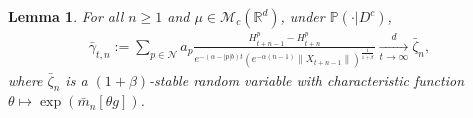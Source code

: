 \documentclass[12pt,a4paper]{amsart}
\theoremstyle{plain}
\newtheorem{lem}[thm]{Lemma}
\theoremstyle{definition}
\numberwithin{equation}{section}
\begin{document}
\begin{lem}
  \label{large-central}
  For all $n\ge 1$ and $\mu\in\mathcal{M}_c(\mathbb{R}^d)$, under $\mathbb{P}(\cdot|D^c)$,
\begin{align}
  \bar{\gamma}_{t,n}
  := \sum_{p\in\mathcal{N}} a_p \frac { H^p_{t+n-1} - H^p_{t+n} } { e^{ - ( \alpha - | p | b ) t } ( e^{ - \alpha ( n - 1 ) } \| X_{ t + n - 1 } \| )^{ \frac { 1 } { 1 + \beta } } }
  \xrightarrow[t\to \infty]{d}\bar{\zeta}_n,
\end{align}
	where $\bar{\zeta}_n$ is a $(1+\beta)$-stable random variable with characteristic function
  $\theta\mapsto \exp(\bar{m}_n[\theta g])$.
\end{lem}
\end{document}

